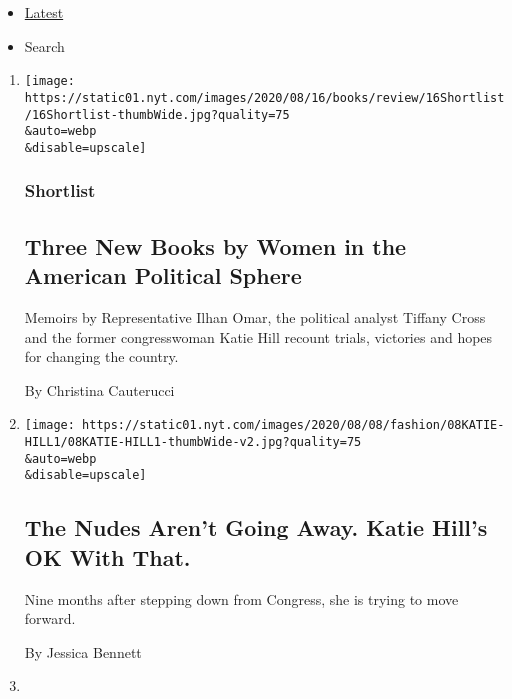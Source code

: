 \begin{itemize}
\tightlist
\item
  \protect\hyperlink{stream-panel}{Latest}
\item
  Search
\end{itemize}

\begin{enumerate}
\def\labelenumi{\arabic{enumi}.}
\item
  \href{/2020/08/08/books/review/katie-hill-she-will-rise-ilhan-omar-tiffany-cross.html}{}

  \texttt{[image: https://static01.nyt.com/images/2020/08/16/books/review/16Shortlist/16Shortlist-thumbWide.jpg?quality=75\\\&auto=webp\\\&disable=upscale]}

  \hypertarget{shortlist}{%
  \subsubsection{Shortlist}\label{shortlist}}

  \hypertarget{three-new-books-by-women-in-the-american-political-sphere}{%
  \subsection{Three New Books by Women in the American Political
  Sphere}\label{three-new-books-by-women-in-the-american-political-sphere}}

  Memoirs by Representative Ilhan Omar, the political analyst Tiffany
  Cross and the former congresswoman Katie Hill recount trials,
  victories and hopes for changing the country.

  By Christina Cauterucci
\item
  \href{/2020/08/08/style/katie-hill-she-will-rise-revenge-porn.html}{}

  \texttt{[image: https://static01.nyt.com/images/2020/08/08/fashion/08KATIE-HILL1/08KATIE-HILL1-thumbWide-v2.jpg?quality=75\\\&auto=webp\\\&disable=upscale]}

  \hypertarget{the-nudes-arent-going-away-katie-hills-ok-with-that}{%
  \subsection{The Nudes Aren't Going Away. Katie Hill's OK With
  That.}\label{the-nudes-arent-going-away-katie-hills-ok-with-that}}

  Nine months after stepping down from Congress, she is trying to move
  forward.

  By Jessica Bennett
\item
  \href{/2020/08/07/books/bernard-bailyn-dead.html}{}


\end{enumerate}
